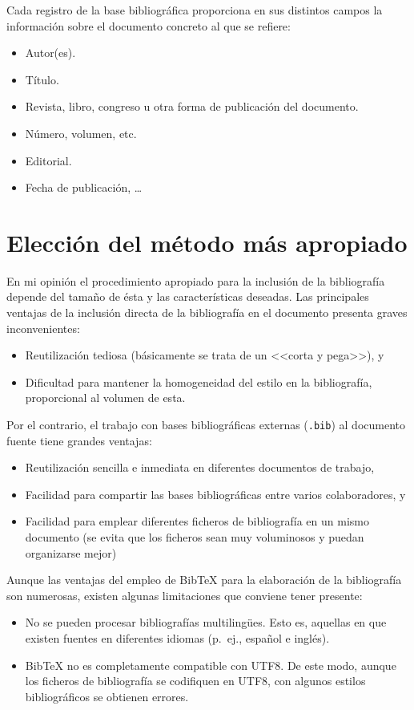 \documentclass[11pt,a4paper]{article}
\begin{document}
Cada registro de la base bibliográfica proporciona en sus distintos campos la información sobre el documento concreto al que se refiere:
\begin{itemize}[noitemsep]
	\item Autor(es).
	\item Título.
	\item Revista, libro, congreso u otra forma de publicación del documento.
	\item Número, volumen, etc.
	\item Editorial.
	\item Fecha de publicación, \dots
\end{itemize}



\section{Elección del método más apropiado}
En mi opinión el procedimiento apropiado para la inclusión de la bibliografía depende del tamaño de ésta y las características deseadas. Las principales ventajas de la inclusión directa de la bibliografía en el documento presenta graves inconvenientes: 
\begin{itemize}
	\item Reutilización tediosa (básicamente se trata de un <<corta y pega>>), y
	\item Dificultad para mantener la homogeneidad del estilo en la bibliografía, proporcional al volumen de esta.
\end{itemize}

Por el contrario, el trabajo con bases bibliográficas externas (\texttt{.bib}) al documento fuente tiene grandes ventajas:
\begin{itemize}
	\item Reutilización sencilla e inmediata en diferentes documentos de trabajo,
	\item Facilidad para compartir las bases bibliográficas entre varios colaboradores, y
	\item Facilidad para emplear diferentes ficheros de bibliografía en un mismo documento (se evita que los ficheros sean muy voluminosos y puedan organizarse mejor)
\end{itemize}

Aunque las ventajas del empleo de Bib\TeX{} para la elaboración de la bibliografía son numerosas, existen algunas limitaciones que conviene tener presente:
\begin{itemize}
	\item No se pueden procesar bibliografías multilingües. Esto es, aquellas en que existen fuentes en diferentes idiomas (p.~ej., español e inglés).
	
	\item Bib\TeX{} no es completamente compatible con UTF8. De este modo,  aunque los ficheros de bibliografía se codifiquen en UTF8, con algunos estilos bibliográficos se obtienen errores.
\end{itemize}
\end{document}
